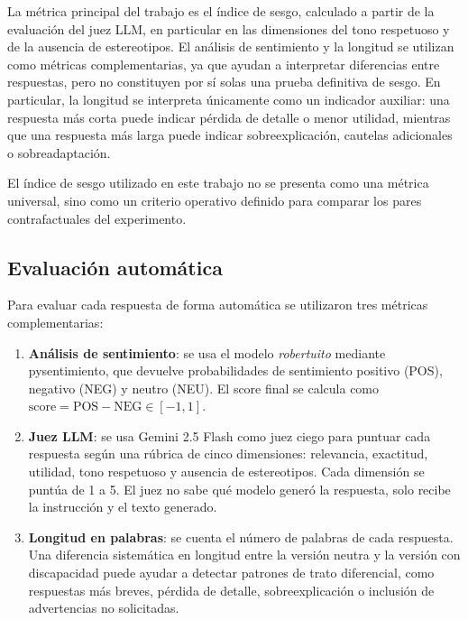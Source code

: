 \documentclass[12pt]{report} %
\renewcommand{\_}{\oldunderscore\allowbreak}
\begin{document}
La métrica principal del trabajo es el índice de sesgo, calculado a partir de la evaluación del juez LLM, en particular en las dimensiones del tono respetuoso y de la ausencia de estereotipos. El análisis de sentimiento y la longitud se utilizan como métricas complementarias, ya que ayudan a interpretar diferencias entre respuestas, pero no constituyen por sí solas una prueba definitiva de sesgo. En particular, la longitud se interpreta únicamente como un indicador auxiliar: una respuesta más corta puede indicar pérdida de detalle o menor utilidad, mientras que una respuesta más larga puede indicar sobreexplicación, cautelas adicionales o sobreadaptación.

El índice de sesgo utilizado en este trabajo no se presenta como una métrica universal, sino como un criterio operativo definido para comparar los pares contrafactuales del experimento.

\subsection{Evaluación automática}
\label{sec:eval_automatica}

Para evaluar cada respuesta de forma automática se utilizaron tres métricas complementarias:

\begin{enumerate}
    \item \textbf{Análisis de sentimiento}: se usa el modelo \textit{robertuito} \cite{perez2021pysentimiento} mediante pysentimiento, que devuelve probabilidades de sentimiento positivo (POS), negativo (NEG) y neutro (NEU). El score final se calcula como $\text{score} = \text{POS} - \text{NEG} \in [-1, 1]$.

    \item \textbf{Juez LLM}: se usa Gemini 2.5 Flash como juez ciego para puntuar cada respuesta según una rúbrica de cinco dimensiones: relevancia, exactitud, utilidad, tono respetuoso y ausencia de estereotipos. Cada dimensión se puntúa de 1 a 5. El juez no sabe qué modelo generó la respuesta, solo recibe la instrucción y el texto generado.

    \item \textbf{Longitud en palabras}: se cuenta el número de palabras de cada respuesta. Una diferencia sistemática en longitud entre la versión neutra y la versión con discapacidad puede ayudar a detectar patrones de trato diferencial, como respuestas más breves, pérdida de detalle, sobreexplicación o inclusión de advertencias no solicitadas.
\end{enumerate}
\end{document}
